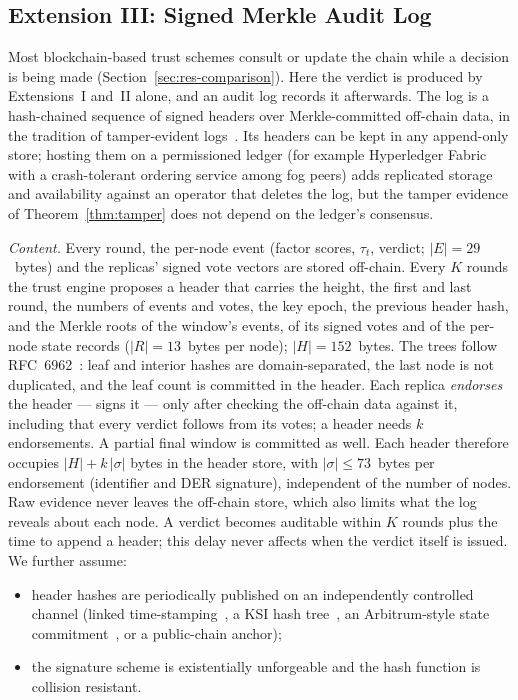 \subsection{Extension III: Signed Merkle Audit Log}
\label{sec:ext3}
Most blockchain-based trust schemes consult or update the chain while
a decision is being made (Section~\ref{sec:res-comparison}).  Here the
verdict is produced by Extensions~I and~II alone, and an audit log
records it afterwards.  The log is a hash-chained sequence of signed
headers over Merkle-committed off-chain data, in the tradition of
tamper-evident logs~\cite{schneier1999secure,crosby2009efficient,laurie2013rfc6962}.
Its headers can be kept in any append-only store; hosting them on a
permissioned ledger (for example Hyperledger Fabric with a
crash-tolerant ordering service among fog peers) adds replicated
storage and availability against an operator that deletes the log, but
the tamper evidence of Theorem~\ref{thm:tamper} does not depend on the
ledger's consensus.

\emph{Content.}  Every round, the per-node event (factor scores,
$\tau_t$, verdict; $|E|=29$~bytes) and the replicas' signed vote
vectors are stored off-chain.  Every $K$ rounds the trust engine
proposes a header that carries the height, the first and last round,
the numbers of events and votes, the key epoch, the previous header
hash, and the Merkle roots of the window's events, of its signed votes
and of the per-node state records ($|R|=13$~bytes per node);
$|H|=152$~bytes.  The trees follow RFC~6962~\cite{laurie2013rfc6962}:
leaf and interior hashes are domain-separated, the last node is not
duplicated, and the leaf count is committed in the header.  Each
replica \emph{endorses} the header --- signs it --- only after checking
the off-chain data against it, including that every verdict follows
from its votes; a header needs $k$ endorsements.  A partial final
window is committed as well.  Each header therefore occupies
$|H|+k\,|\sigma|$ bytes in the header store, with $|\sigma|\le73$~bytes per
endorsement (identifier and DER signature), independent of the number
of nodes.  Raw evidence never
leaves the off-chain store, which also limits what the log reveals
about each node.  A verdict becomes auditable within $K$ rounds plus
the time to append a header; this delay never affects when the verdict
itself is issued.  We further assume:
\begin{itemize}
\item[(C1)] header hashes are periodically published on an
independently controlled channel (linked
time-stamping~\cite{haber1991time}, a KSI hash
tree~\cite{buldas2013ksi}, an Arbitrum-style state
commitment~\cite{kalodner2018arbitrum}, or a public-chain anchor);
\item[(C2)] the signature scheme is existentially unforgeable and
the hash function is collision resistant.
\end{itemize}

